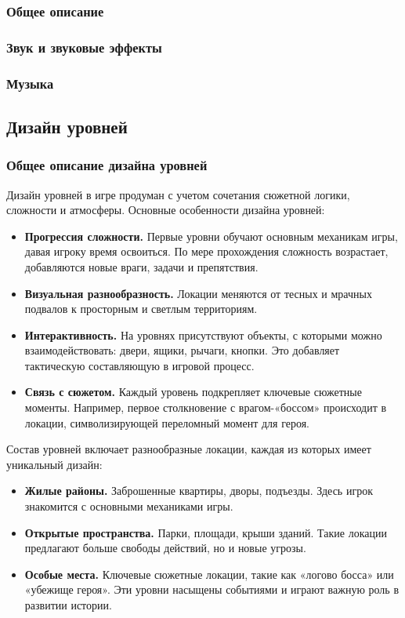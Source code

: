 \documentclass[12pt]{article}
\begin{document}
        \subsubsection{Общее описание}
        \subsubsection{Звук и звуковые эффекты}
        \subsubsection{Музыка}
    \subsection{Дизайн уровней}
    
        \subsubsection{Общее описание дизайна уровней}
        Дизайн уровней в игре продуман с учетом сочетания сюжетной логики, сложности и атмосферы.
        Основные особенности дизайна уровней:  
        \begin{itemize}
            \item \textbf{Прогрессия сложности.} Первые уровни обучают основным механикам игры, давая игроку время освоиться. По мере прохождения сложность возрастает, добавляются новые враги, задачи и препятствия.  
            \item \textbf{Визуальная разнообразность.} Локации меняются от тесных и мрачных подвалов к просторным и светлым территориям.  
            \item \textbf{Интерактивность.} На уровнях присутствуют объекты, с которыми можно взаимодействовать: двери, ящики, рычаги, кнопки. Это добавляет тактическую составляющую в игровой процесс.  
            \item \textbf{Связь с сюжетом.} Каждый уровень подкрепляет ключевые сюжетные моменты. Например, первое столкновение с врагом-«боссом» происходит в локации, символизирующей переломный момент для героя.  
        \end{itemize}
        
        Состав уровней включает разнообразные локации, каждая из которых имеет уникальный дизайн:  
        \begin{itemize}
            \item \textbf{Жилые районы.} Заброшенные квартиры, дворы, подъезды. Здесь игрок знакомится с основными механиками игры.  
            \item \textbf{Открытые пространства.} Парки, площади, крыши зданий. Такие локации предлагают больше свободы действий, но и новые угрозы.  
            \item \textbf{Особые места.} Ключевые сюжетные локации, такие как «логово босса» или «убежище героя». Эти уровни насыщены событиями и играют важную роль в развитии истории.  
        \end{itemize}
        
\end{document}
